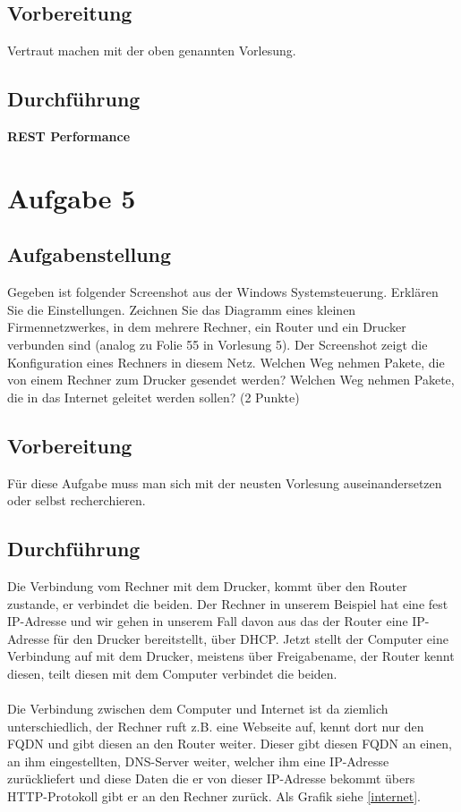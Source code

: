 \subsection{Vorbereitung}
Vertraut machen mit der oben genannten Vorlesung.

\subsection{Durchführung}
\textbf{REST Performance}

\section{Aufgabe 5} 

\subsection{Aufgabenstellung}
Gegeben ist folgender Screenshot aus der Windows Systemsteuerung. Erklären Sie die Einstellungen. Zeichnen Sie das Diagramm eines kleinen Firmennetzwerkes, in dem mehrere Rechner, ein Router und ein Drucker verbunden sind (analog zu Folie 55 in Vorlesung 5). Der Screenshot zeigt die Konfiguration eines Rechners in diesem Netz. Welchen Weg nehmen Pakete, die von einem Rechner zum Drucker gesendet werden? Welchen Weg nehmen Pakete, die in das Internet geleitet werden sollen? (2 Punkte)

\subsection{Vorbereitung}
Für diese Aufgabe muss man sich mit der neusten Vorlesung auseinandersetzen oder selbst recherchieren.

\subsection{Durchführung}
Die Verbindung vom Rechner mit dem Drucker, kommt über den Router zustande, er verbindet die beiden. Der Rechner in unserem Beispiel hat eine fest IP-Adresse und wir gehen in unserem Fall davon aus das der Router eine IP-Adresse für den Drucker bereitstellt, über DHCP. Jetzt stellt der Computer eine Verbindung auf mit dem Drucker, meistens über Freigabename, der Router kennt diesen, teilt diesen mit dem Computer verbindet die beiden.\\\\Die Verbindung zwischen dem Computer und Internet ist da ziemlich unterschiedlich, der Rechner ruft z.B. eine Webseite auf, kennt dort nur den FQDN und gibt diesen an den Router weiter. Dieser gibt diesen FQDN an einen, an ihm eingestellten, DNS-Server weiter, welcher ihm eine IP-Adresse zurückliefert und diese Daten die er von dieser IP-Adresse bekommt übers HTTP-Protokoll gibt er an den Rechner zurück. Als Grafik siehe \autoref{internet}.

